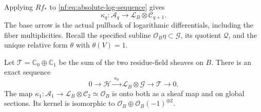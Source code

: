 Applying $Rf_*$ to \eqref{nf:eq:absolute-log-sequence} gives
\begin{equation}\label{hr:eq:KS-maps}
 \kappa_q:\mathcal A_q\longrightarrow
                 \mathscr L_B\otimes\mathcal C_{q+1}.
\end{equation}
The base arrow is the actual pullback of logarithmic
differentials, including the fiber multiplicities.
Recall the specified subline
$\mathcal O_B\eta\subset\mathcal G$, its quotient $\mathcal Q$,
and the unique relative form $\theta$ with $\theta(V)=1$.

\begin{proposition}\label{hr:prop:KS}
Let $\mathcal T=\mathbb C_0\oplus\mathbb C_1$ be the sum of
the two residue-field sheaves on $B$. There is an exact sequence
\begin{equation}\label{hr:eq:KS-zero}
 0\longrightarrow\mathcal H\xrightarrow{\ \kappa_0\ }
 \mathscr L_B\otimes\mathcal G
 \longrightarrow\mathcal T\longrightarrow0.
\end{equation}
The map
$\kappa_1:\mathcal A_1\to\mathscr L_B\otimes\mathcal C_2
\simeq\mathcal O_B$ is onto both as a sheaf map and on global
sections. Its kernel is isomorphic to
$\mathcal O_B\oplus\mathcal O_B(-1)^{\oplus2}$.
\end{proposition}

